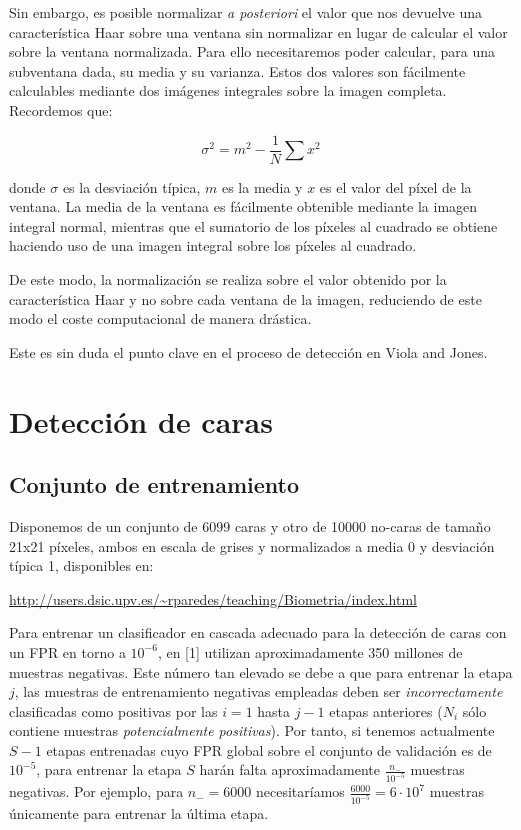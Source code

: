 \documentclass[11pt,spanish,a4paper]{article} %
\begin{document}
Sin embargo, es posible normalizar \textit{a posteriori} el valor que nos devuelve una característica Haar sobre una ventana sin normalizar en lugar de calcular el valor sobre la ventana normalizada. Para ello necesitaremos poder calcular, para una subventana dada, su media y su varianza. Estos dos valores son fácilmente calculables mediante dos imágenes integrales sobre la imagen completa. Recordemos que:

\[ \sigma^{2} = m^2 - \frac{1}{N} \sum x^2 \]

donde $\sigma$ es la desviación típica, $m$ es la media y $x$ es el valor del píxel de la ventana. La media de la ventana es fácilmente obtenible mediante la imagen integral normal, mientras que el sumatorio de los píxeles al cuadrado se obtiene haciendo uso de una imagen integral sobre los píxeles al cuadrado.

De este modo, la normalización se realiza sobre el valor obtenido por la característica Haar y no sobre cada ventana de la imagen, reduciendo de este modo el coste computacional de manera drástica. 

Este es sin duda el punto clave en el proceso de detección en Viola and Jones.

\section{Detección de caras}

\subsection{Conjunto de entrenamiento}

Disponemos de un conjunto de 6099 caras y otro de 10000 no-caras de tamaño 21x21 píxeles, ambos en escala de grises y normalizados a media 0 y desviación típica 1, disponibles en:

\vspace*{1em}
\url{http://users.dsic.upv.es/~rparedes/teaching/Biometria/index.html}
\vspace*{1em}

Para entrenar un clasificador en cascada adecuado para la detección de caras con un FPR en torno a $10^{-6}$, en [1] utilizan aproximadamente 350 millones de muestras negativas. Este número tan elevado se debe a que para entrenar la etapa $j$, las muestras de entrenamiento negativas empleadas deben ser \textit{incorrectamente} clasificadas como positivas por las $i=1$ hasta $j-1$ etapas anteriores ($N_i$ sólo contiene muestras \textit{potencialmente positivas}). Por tanto, si tenemos actualmente $S-1$ etapas entrenadas cuyo FPR global sobre el conjunto de validación es de $10^{-5}$, para entrenar la etapa $S$ harán falta aproximadamente $\frac{n_{-}}{10^{-5}}$ muestras negativas. Por ejemplo, para $n_{-} = 6000$ necesitaríamos $\frac{6000}{10^{-5}} = 6 \cdot 10^7$ muestras únicamente para entrenar la última etapa.
\end{document}
